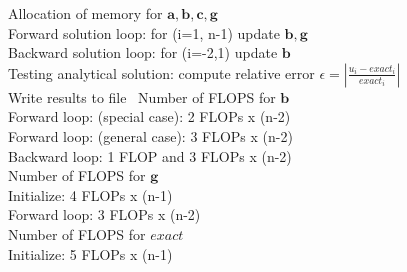\documentclass[%
oneside,                 %
final,                   %
10pt]{article}
\begin{document}
Allocation of memory for $ \mathbf{a}, \mathbf{b}, \mathbf{c}, \mathbf{g}$ \\
Forward solution loop: for (i=1, n-1) update $\mathbf{b}, \mathbf{g}$ \\
Backward solution loop: for (i=-2,1) update $\mathbf{b}$ \\
Testing analytical solution: compute relative error $  \epsilon =  \left\lvert \frac{u_i-exact_i}{exact_i} \right\rvert$ \\
Write results to file \
Number of FLOPS for $\mathbf{b}$ \\
Forward loop: (special case): 2 FLOPs x (n-2) \\
Forward loop: (general case): 3 FLOPs x (n-2) \\
Backward loop: 1 FLOP and 3 FLOPs x (n-2) \\

Number of FLOPS for $\mathbf{g}$ \\
Initialize: 4 FLOPs x (n-1) \\
Forward loop: 3 FLOPs x (n-2)\\
Number of FLOPS for $exact$\\
Initialize: 5 FLOPs x (n-1)













\end{document}
